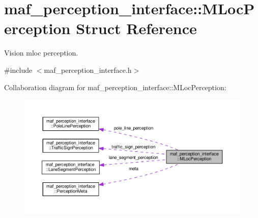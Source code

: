 \hypertarget{structmaf__perception__interface_1_1MLocPerception}{}\section{maf\+\_\+perception\+\_\+interface\+:\+:M\+Loc\+Perception Struct Reference}
\label{structmaf__perception__interface_1_1MLocPerception}


Vision mloc perception.  




{\ttfamily \#include $<$maf\+\_\+perception\+\_\+interface.\+h$>$}



Collaboration diagram for maf\+\_\+perception\+\_\+interface\+:\+:M\+Loc\+Perception\+:\nopagebreak
\begin{figure}[H]
\begin{center}
\leavevmode
\includegraphics[width=350pt]{structmaf__perception__interface_1_1MLocPerception__coll__graph}
\end{center}
\end{figure}
